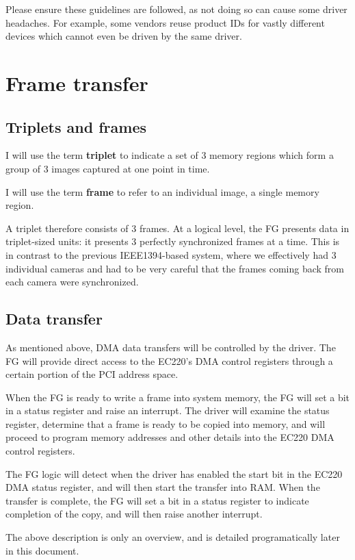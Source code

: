 \documentclass[12pt]{article}
\begin{document}
Please ensure these guidelines are followed, as not doing so can cause some driver headaches. For example, some vendors reuse product IDs for vastly different devices which cannot even be driven by the same driver.

\section{Frame transfer}

\subsection{Triplets and frames}

I will use the term \textbf{triplet} to indicate a set of 3 memory regions which form a group of 3 images captured at one point in time.

I will use the term \textbf{frame} to refer to an individual image, a single memory region.

A triplet therefore consists of 3 frames. At a logical level, the FG presents data in triplet-sized units: it presents 3 perfectly synchronized frames at a time. This is in contrast to the previous IEEE1394-based system, where we effectively had 3 individual cameras and had to be very careful that the frames coming back from each camera were synchronized.

\subsection{Data transfer}

As mentioned above, DMA data transfers will be controlled by the driver. The FG will provide direct access to the EC220's DMA control registers through a certain portion of the PCI address space.

When the FG is ready to write a frame into system memory, the FG will set a bit in a status register and raise an interrupt. The driver will examine the status register, determine that a frame is ready to be copied into memory, and will proceed to program memory addresses and other details into the EC220 DMA control registers.

The FG logic will detect when the driver has enabled the start bit in the EC220 DMA status register, and will then start the transfer into RAM. When the transfer is complete, the FG will set a bit in a status register to indicate completion of the copy, and will then raise another interrupt.

The above description is only an overview, and is detailed programatically later in this document.
\end{document}
